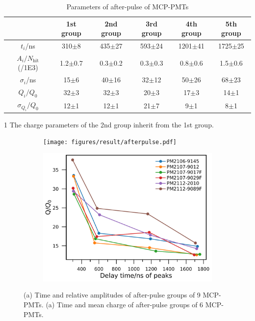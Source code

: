 \begin{table}
    \centering
    \caption{Parameters of after-pulse of MCP-PMTs}
    \label{tab:afterpulse}
    \begin{threeparttable}
        \begin{tabular}{c|c|c|c|c|c}
            \hline
            &1st group&2nd group&3rd group&4th group&5th group\\
            \hline
            $t_i$/ns&310$\pm$8&435$\pm$27&593$\pm$24&1201$\pm$41&1725$\pm$25\\
            $A_i/N_{\mathrm{hit}}$(/1E3)&1.2$\pm$0.7&0.3$\pm$0.2&0.3$\pm$0.3&0.8$\pm$0.6&1.5$\pm$0.6\\
            $\sigma_i$/ns&15$\pm$6&40$\pm$16 &32$\pm$12&50$\pm$26&68$\pm$23\\
            $Q_i/Q_0$&32$\pm$3&32$\pm$3\tnote{1}&20$\pm$3&17$\pm$3&14$\pm$1\\
            $\sigma_{Q_i}/Q_0$&12$\pm$1&12$\pm$1\tnote{1}&21$\pm$7&9$\pm$1&8$\pm$1\\
            \hline
        \end{tabular}
        \begin{tablenotes}
            \footnotesize
            \item[1] The charge parameters of the 2nd group inherit from the 1st group.
        \end{tablenotes}
    \end{threeparttable}
\end{table}

\begin{figure}[!htbp]
    \centering
    \begin{subfigure}[t]{\SF\textwidth}
        \texttt{[image: figures/result/afterpulse.pdf]}
        \caption{}%
        \label{fig:afterpulsePeak}
    \end{subfigure}
    \begin{subfigure}[t]{\SF\textwidth}
        \includegraphics[width=\textwidth]{figures/result/afterpulseQ.pdf}
        \caption{}%
        \label{fig:afterpulseQ}
    \end{subfigure}
    \caption{(a) Time and relative amplitudes of after-pulse groups of 9 MCP-PMTs. (a) Time and mean charge of after-pulse groups of 6 MCP-PMTs.}
\end{figure}

